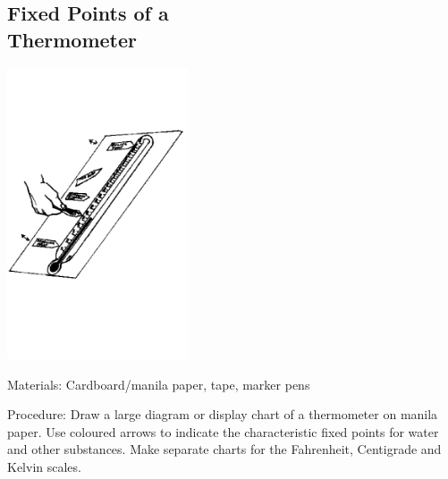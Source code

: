 \begin{multicols}{2}
\vfill
\columnbreak

\subsection[Fixed Points of a Thermometer]{Fixed Points of a \hfill \\ Thermometer} 

\begin{center}
\includegraphics[width=0.4\textwidth]{./img/source/fixed-points.png}
\end{center}

\begin{description*}
\item[Materials:]{Cardboard/manila paper, tape, marker pens}
\item[Procedure:]{Draw a large diagram or display chart of a thermometer on manila paper. Use coloured arrows to indicate the characteristic fixed points for water and other substances. Make separate charts for the Fahrenheit, Centigrade and Kelvin scales.}
\end{description*}

\vfill
\pagebreak





\end{multicols}

